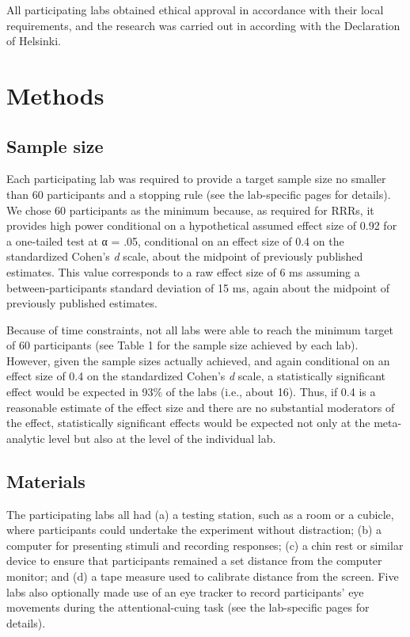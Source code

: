 \documentclass[man,floatsintext]{apa6}
\theoremstyle{definition}
\theoremstyle{definition}
\theoremstyle{definition}
\theoremstyle{remark}
\begin{document}
All participating labs obtained ethical approval in accordance with
their local requirements, and the research was carried out in according
with the Declaration of Helsinki.

\section{Methods}\label{methods}

\subsection{Sample size}\label{sample-size}

Each participating lab was required to provide a target sample size no
smaller than 60 participants and a stopping rule (see the lab-specific
pages for details). We chose 60 participants as the minimum because, as
required for RRRs, it provides high power conditional on a hypothetical
assumed effect size of 0.92 for a one-tailed test at α = .05,
conditional on an effect size of 0.4 on the standardized Cohen's
\emph{d} scale, about the midpoint of previously published estimates.
This value corresponds to a raw effect size of 6 ms assuming a
between-participants standard deviation of 15 ms, again about the
midpoint of previously published estimates.

Because of time constraints, not all labs were able to reach the minimum
target of 60 participants (see Table 1 for the sample size achieved by
each lab). However, given the sample sizes actually achieved, and again
conditional on an effect size of 0.4 on the standardized Cohen's
\emph{d} scale, a statistically significant effect would be expected in
93\% of the labs (i.e., about 16). Thus, if 0.4 is a reasonable estimate
of the effect size and there are no substantial moderators of the
effect, statistically significant effects would be expected not only at
the meta-analytic level but also at the level of the individual lab.

\subsection{Materials}\label{materials}

The participating labs all had (a) a testing station, such as a room or
a cubicle, where participants could undertake the experiment without
distraction; (b) a computer for presenting stimuli and recording
responses; (c) a chin rest or similar device to ensure that participants
remained a set distance from the computer monitor; and (d) a tape
measure used to calibrate distance from the screen. Five labs also
optionally made use of an eye tracker to record participants' eye
movements during the attentional-cuing task (see the lab-specific pages
for details).
\end{document}
